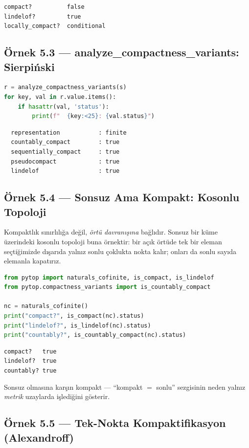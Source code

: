 \begin{verbatim}
compact?          false
lindelof?         true
locally_compact?  conditional
\end{verbatim}

\subsection*{Örnek 5.3 — analyze\_compactness\_variants: Sierpiński}

\begin{lstlisting}[language=Python]
r = analyze_compactness_variants(s)
for key, val in r.value.items():
    if hasattr(val, 'status'):
        print(f"  {key:<25}: {val.status}")
\end{lstlisting}

\begin{verbatim}
  representation           : finite
  countably_compact        : true
  sequentially_compact     : true
  pseudocompact            : true
  lindelof                 : true
\end{verbatim}

\subsection*{Örnek 5.4 — Sonsuz Ama Kompakt: Kosonlu Topoloji}

Kompaktlık sınırlılığa değil, \emph{örtü davranışına} bağlıdır. Sonsuz bir küme
üzerindeki kosonlu topoloji buna örnektir: bir açık örtüde tek bir eleman
seçtiğimizde dışarıda yalnız sonlu çoklukta nokta kalır; onları da sonlu sayıda
elemanla kapatırız.

\begin{lstlisting}[language=Python]
from pytop import naturals_cofinite, is_compact, is_lindelof
from pytop.compactness_variants import is_countably_compact

nc = naturals_cofinite()
print("compact?", is_compact(nc).status)
print("lindelof?", is_lindelof(nc).status)
print("countably?", is_countably_compact(nc).status)
\end{lstlisting}

\begin{verbatim}
compact?   true
lindelof?  true
countably? true
\end{verbatim}

Sonsuz olmasına karşın kompakt --- ``kompakt $=$ sonlu'' sezgisinin neden yalnız
\emph{metrik} uzaylarda işlediğini gösterir.

\subsection*{Örnek 5.5 — Tek-Nokta Kompaktifikasyon (Alexandroff)}

